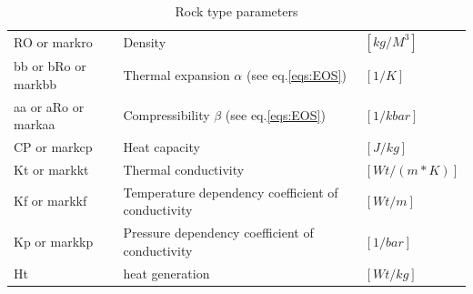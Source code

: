 \begin{table}[H]
\begin{table}[H]
\begin{tabular}{l p{8cm} l}
RO or markro & Density & $[kg/M^3]$ \\ 
bb or bRo or markbb & Thermal expansion $\alpha$ (see eq.\ref{eqs:EOS}) & $[1/K]$ \\ 
aa or aRo or markaa & Compressibility $\beta$ (see eq.\ref{eqs:EOS}) & $[1/kbar]$\\ 
CP or markcp & Heat capacity  & $[J/kg]$ \\ 
Kt or markkt & Thermal conductivity & $[Wt/(m*K)]$ \\ 
Kf or markkf & Temperature dependency coefficient of conductivity & $[Wt/m]$ \\ 
Kp or markkp & Pressure dependency coefficient of conductivity & $[1/bar]$ \\ 
Ht & heat generation & $[Wt/kg]$\\ 
\bottomrule
\end{tabular}
\caption{Rock type parameters}
\label{tbl:rock_type_parameters}
\end{table}



\end{table}
